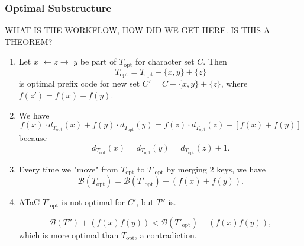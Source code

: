\subsubsection{Optimal Substructure}
WHAT IS THE WORKFLOW, HOW DID WE GET HERE. IS THIS A THEOREM?
\begin{theorem}
    \begin{enumerate}
        \item Let \( x \) $\leftarrow z \rightarrow$ \( y \) be part of \( T_{\text{opt}} \) for character set \( C \). Then
        \[
        T_{\text{opt}} = T_{\text{opt}} - \{x, y\} + \{z\}
        \]
        is optimal prefix code for new set \( C' = C - \{x, y\} + \{z\} \), where \( f(z') = f(x) + f(y) \).
    
        \item We have
        \[
        f(x) \cdot d_{T_{\text{opt}}}(x) + f(y) \cdot d_{T_{\text{opt}}}(y) = f(z) \cdot d_{T_{\text{opt}}}(z) + [f(x) + f(y)]
        \]
        because 
        \[
        d_{T_{\text{opt}}}(x) = d_{T_{\text{opt}}}(y) = d_{T_{\text{opt}}}(z) + 1.
        \]
    
        \item Every time we "move" from \( T_{\text{opt}} \) to \( T'_{\text{opt}} \) by merging 2 keys, we have
        \[
        \mathcal{B}(T_{\text{opt}}) = \mathcal{B}(T'_{\text{opt}}) + (f(x) + f(y)).
        \]
    
        \item ATaC \( T'_{\text{opt}} \) is not optimal for \( C' \), but \( T'' \) is. 
    
        \[
        \mathcal{B}(T'') + (f(x) f(y)) < \mathcal{B}(T'_{\text{opt}}) + (f(x) f(y)),
        \]
        which is more optimal than \( T_{\text{opt}} \), a contradiction.
    \end{enumerate}

\end{theorem}